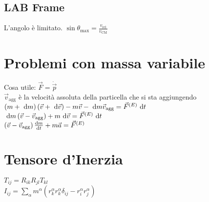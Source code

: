\documentclass[a4paper,NoNotes,GeneralMath,12pt]{stdmdoc}
\begin{document}
	\subsection*{LAB Frame}
	L'angolo è limitato. $\sin \theta_{\text{max}} = \frac{v_\text{rel}}{v_\text{CM}}$

	\section*{Problemi con massa variabile}
	Cosa utile: $\vec{F} = \dot{\vec{p}}$ \\
	$\vec{v}_\text{agg}$ è la velocità assoluta della particella che si sta aggiungendo \\
	$\left( m + \de m \right) \left( \vec{v} + \de \vec{v} \right) - m \vec{v} - \de m \vec{v}_\text{agg} = \vec{F}^{(E)} \de t$ \\
	$\de{m} \left( \vec{v} - \vec{v}_\text{agg} \right) + m \de{\vec{v}} = \vec{F}^{(E)} \de{t}$ \\
	$\left( \vec{v} - \vec{v}_\text{agg} \right) \de{m}{t} + m \vec{a} = \vec{F}^{(E)}$

	\section*{Tensore d'Inerzia}
	$T_{ij} = R_{ik} R_{jl} T_{kl}$ \\ $I_{ij} = \sum_\alpha m^{\alpha} \left( r_k^\alpha r_k^\alpha \delta_{ij} - r_i^\alpha r_j^\alpha \right)$
\end{document}
